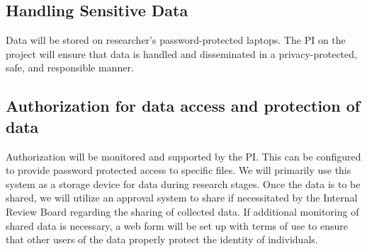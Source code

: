 \subsection*{Handling Sensitive Data}
Data will be stored on researcher’s password-protected laptops.
The PI on the project will ensure that data is handled and disseminated in a privacy-protected, safe, and responsible manner. 
\subsection*{Authorization for data access and protection of data}
Authorization will be monitored and supported by the PI. This can be configured to provide password protected access to specific files. We will primarily use this system as a storage device for data during research stages. Once the data is to be shared, we will utilize an approval system to share if necessitated by the Internal Review Board regarding the sharing of collected data. If additional monitoring of shared data is necessary, a web form will be set up with terms of use to ensure that other users of the data properly protect the identity of individuals.
